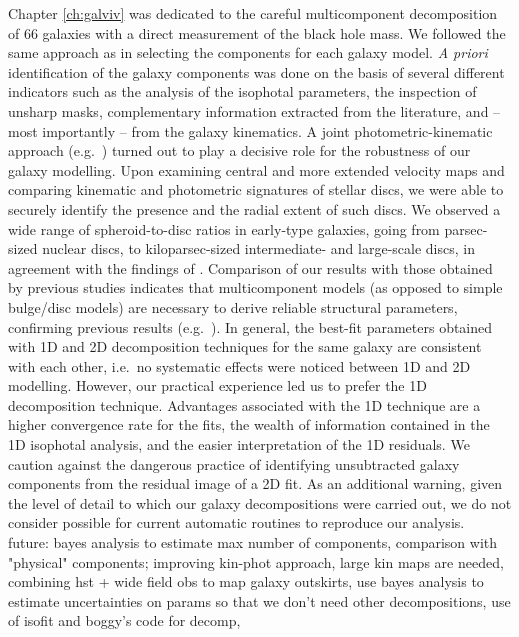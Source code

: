 Chapter \ref{ch:galviv} \citep{paperI} was dedicated to the careful multicomponent decomposition of 66 galaxies 
with a direct measurement of the black hole mass. 
We followed the same approach as \citet{laurikainen2005} in selecting the components for each galaxy model.  
\emph{A priori} identification of the galaxy components was done on the basis of several different indicators 
such as the analysis of the isophotal parameters, 
the inspection of unsharp masks, 
complementary information extracted from the literature, 
and -- most importantly -- from the galaxy kinematics. 
A joint photometric-kinematic approach (e.g.~\citealt{krajnovic2013,arnold2014}) 
turned out to play a decisive role for the robustness of our galaxy modelling. 
Upon examining central \citep{atlas3dIII,scott2014} and more extended \citep{arnold2014} velocity maps 
and comparing kinematic and photometric signatures of stellar discs, 
we were able to securely identify the presence and the radial extent of such discs. 
We observed a wide range of spheroid-to-disc ratios in early-type galaxies, 
going from parsec-sized nuclear discs, to kiloparsec-sized intermediate- and large-scale discs, 
in agreement with the findings of \citet{krajnovic2013}. 
Comparison of our results with those obtained by previous studies indicates that 
multicomponent models (as opposed to simple bulge/disc models) are necessary 
to derive reliable structural parameters, confirming previous results 
(e.g.~\citealt{laurikainen2005,laurikainen2007,laurikainen2010,lasker2014data,salo2015}). 
In general, the best-fit parameters obtained with 1D and 2D decomposition techniques for the same galaxy 
are consistent with each other, 
i.e.~no systematic effects were noticed between 1D and 2D modelling. 
However, our practical experience led us to prefer the 1D decomposition technique. 
Advantages associated with the 1D technique are a higher convergence rate for the fits, 
the wealth of information contained in the 1D isophotal analysis, 
and the easier interpretation of the 1D residuals. 
We caution against the dangerous practice of identifying unsubtracted galaxy components 
from the residual image of a 2D fit. 
As an additional warning, 
given the level of detail to which our galaxy decompositions were carried out, 
we do not consider possible for current automatic routines to reproduce our analysis. \\
future: bayes analysis to estimate max number of components, comparison with "physical" components; 
improving kin-phot approach, large kin maps are needed, 
combining hst + wide field obs to map galaxy outskirts, 
use bayes analysis to estimate uncertainties on params so that we don't need other decompositions, 
use of isofit and boggy's code for decomp, \\

